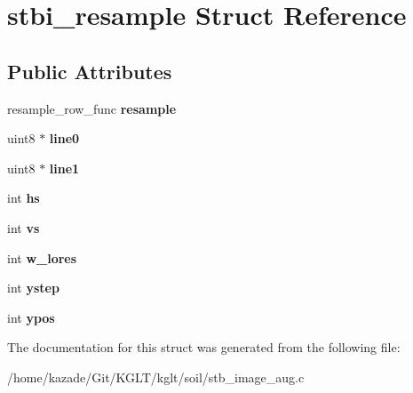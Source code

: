 \hypertarget{structstbi__resample}{\section{stbi\-\_\-resample Struct Reference}
\label{structstbi__resample}
}
\subsection*{Public Attributes}
\begin{DoxyCompactItemize}
\item 
\hypertarget{structstbi__resample_a94091463ebc5933cdaf7a813025b6e19}{resample\-\_\-row\-\_\-func {\bfseries resample}}\label{structstbi__resample_a94091463ebc5933cdaf7a813025b6e19}

\item 
\hypertarget{structstbi__resample_a30c51395efffb663b183d7c64def6db3}{uint8 $\ast$ {\bfseries line0}}\label{structstbi__resample_a30c51395efffb663b183d7c64def6db3}

\item 
\hypertarget{structstbi__resample_ac1165a6da3cf652b951056667f89b1f2}{uint8 $\ast$ {\bfseries line1}}\label{structstbi__resample_ac1165a6da3cf652b951056667f89b1f2}

\item 
\hypertarget{structstbi__resample_a1513390ba0102364169a52ff26d5e0f2}{int {\bfseries hs}}\label{structstbi__resample_a1513390ba0102364169a52ff26d5e0f2}

\item 
\hypertarget{structstbi__resample_a331c717f53239339c0c678f92a7bf4d5}{int {\bfseries vs}}\label{structstbi__resample_a331c717f53239339c0c678f92a7bf4d5}

\item 
\hypertarget{structstbi__resample_a41d43c7b0d6caafbf0dfa8ef064bd2a2}{int {\bfseries w\-\_\-lores}}\label{structstbi__resample_a41d43c7b0d6caafbf0dfa8ef064bd2a2}

\item 
\hypertarget{structstbi__resample_a0c479143447d103e73348c89f8b4ef1c}{int {\bfseries ystep}}\label{structstbi__resample_a0c479143447d103e73348c89f8b4ef1c}

\item 
\hypertarget{structstbi__resample_aa1f1ad33e739f7a38fbad8752f64f983}{int {\bfseries ypos}}\label{structstbi__resample_aa1f1ad33e739f7a38fbad8752f64f983}

\end{DoxyCompactItemize}


The documentation for this struct was generated from the following file\-:\begin{DoxyCompactItemize}
\item 
/home/kazade/\-Git/\-K\-G\-L\-T/kglt/soil/stb\-\_\-image\-\_\-aug.\-c\end{DoxyCompactItemize}
